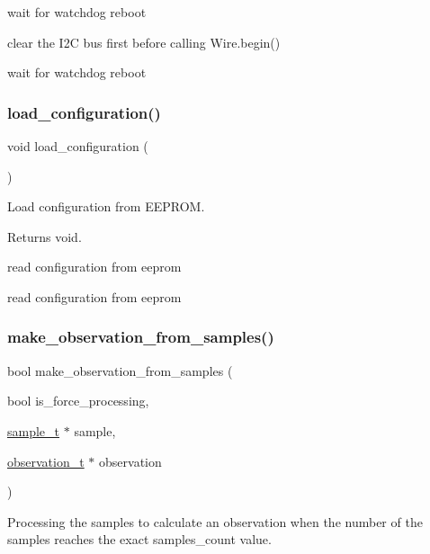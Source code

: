 wait for watchdog reboot

clear the I2C bus first before calling Wire.\+begin()

wait for watchdog reboot \mbox{\label{i2c-th_8h_a1be652e7d942160a14a560e0be837358}} 
\subsubsection{\texorpdfstring{load\+\_\+configuration()}{load\_configuration()}}
{\footnotesize\ttfamily void load\+\_\+configuration (\begin{DoxyParamCaption}{ }\end{DoxyParamCaption})}



Load configuration from E\+E\+P\+R\+OM. 

\begin{DoxyReturn}{Returns}
void. 
\end{DoxyReturn}
read configuration from eeprom

read configuration from eeprom \mbox{\label{i2c-th_8h_a1c5769e114267b210fb3812064d01dd0}} 
\subsubsection{\texorpdfstring{make\+\_\+observation\+\_\+from\+\_\+samples()}{make\_observation\_from\_samples()}}
{\footnotesize\ttfamily bool make\+\_\+observation\+\_\+from\+\_\+samples (\begin{DoxyParamCaption}\item[{bool}]{is\+\_\+force\+\_\+processing,  }\item[{\hyperlink{structsample__t}{sample\+\_\+t} $\ast$}]{sample,  }\item[{\hyperlink{structobservation__t}{observation\+\_\+t} $\ast$}]{observation }\end{DoxyParamCaption})}



Processing the samples to calculate an observation when the number of the samples reaches the exact samples\+\_\+count value. 


